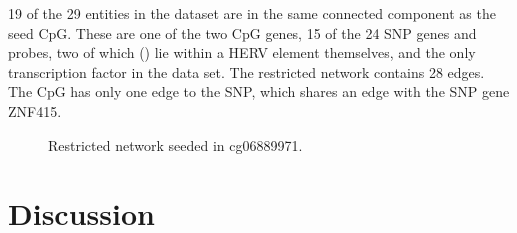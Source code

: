 \documentclass[a4paper,12pt,twoside,openright]{article}
\let\oldsection\section
\def\section{\cleardoublepage\oldsection}
\begin{document}
19 of the 29 entities in the dataset are in the same connected component as the seed CpG. These are one of the two CpG genes, 15 of the 24 SNP genes and probes, two of which () lie within a HERV element themselves, and the only transcription factor in the data set. The restricted network contains 28 edges. The CpG has only one edge to the SNP, which shares an edge with the SNP gene ZNF415. 
\begin{figure}[tb]
	\caption{Restricted network seeded in cg06889971. }
    \label{fig:cg06889971.ggm.network}
\end{figure}

\newpage
\section{Discussion}
\label{Discussion}
\end{document}
